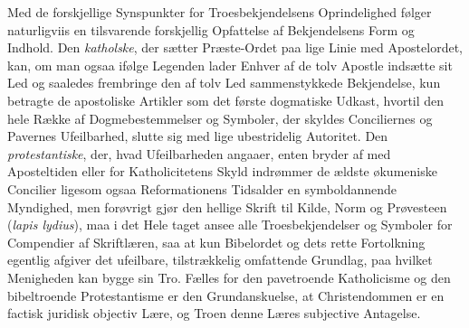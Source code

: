 \documentclass[12pt]{book}
\begin{document}
Med de forskjellige Synspunkter for Troesbekjendelsens
Oprindelighed følger naturligviis en tilsvarende forskjellig
Opfattelse af Bekjendelsens Form og Indhold. Den \emph{katholske},
der sætter Præste-Ordet paa lige Linie med Apostelordet, kan, om man
ogsaa ifølge Legenden lader Enhver af de tolv Apostle indsætte sit
Led og saaledes frembringe den af tolv Led sammenstykkede
Bekjendelse, kun betragte de apostoliske Artikler som det første
dogmatiske Udkast, hvortil den hele Række af Dogmebestemmelser og
Symboler, der skyldes Conciliernes og Pavernes Ufeilbarhed, slutte
sig med lige ubestridelig
Autoritet. Den \emph{protestantiske}, der, hvad Ufeilbarheden
angaaer, enten bryder af med Aposteltiden eller for Katholicitetens
Skyld indrømmer de ældste økumeniske Concilier ligesom ogsaa
Reformationens Tidsalder en symboldannende Myndighed, men forøvrigt
gjør den hellige Skrift til Kilde, Norm og Prøvesteen (\textit{lapis
lydius}), maa i det Hele taget ansee alle Troesbekjendelser og
Symboler for Compendier af Skriftlæren, saa at kun Bibelordet og
dets rette Fortolkning egentlig afgiver det ufeilbare, tilstrækkelig
omfattende Grundlag, paa hvilket Menigheden kan bygge sin Tro.
Fælles for den pavetroende Katholicisme og den bibeltroende
Protestantisme er den Grundanskuelse, at Christendommen er en
factisk juridisk objectiv Lære, og Troen denne Læres subjective
Antagelse.
\end{document}
